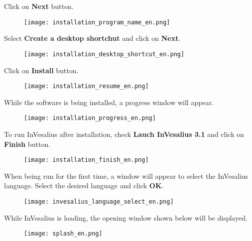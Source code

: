 Click on \textbf{Next}  button.
\begin{figure}[!htb]
\centering
\texttt{[image: installation\_program\_name\_en.png]}
\end{figure}

\hspace{.2cm}

Select \textbf{Create a desktop shortchut} and click on \textbf{Next}.

\begin{figure}[!htb]
\centering
\texttt{[image: installation\_desktop\_shortcut\_en.png]}
\end{figure}

\newpage

Click on \textbf{Install} button.

\begin{figure}[!htb]
\centering
\texttt{[image: installation\_resume\_en.png]}
\end{figure}

\hspace{.2cm}

While the software is being installed, a progress window will appear.

\begin{figure}[!htb]
\centering
\texttt{[image: installation\_progress\_en.png]}
\end{figure}

\newpage

To run InVesalius after installation, check \textbf{Lauch InVesalius 3.1} and click on \textbf{Finish} button.

\begin{figure}[!htb]
\centering
\texttt{[image: installation\_finish\_en.png]}
\end{figure}

\hspace{.2cm}

When being run for the first time, a window will appear to select the InVesalius language. Select the desired language and click \textbf{OK}.

\begin{figure}[!htb]
\centering
\texttt{[image: invesalius\_language\_select\_en.png]}
\end{figure}

\newpage

While InVesalius is loading, the opening window shown below will be displayed.

\begin{figure}[!htb]
\centering
\texttt{[image: splash\_en.png]}
\end{figure}

